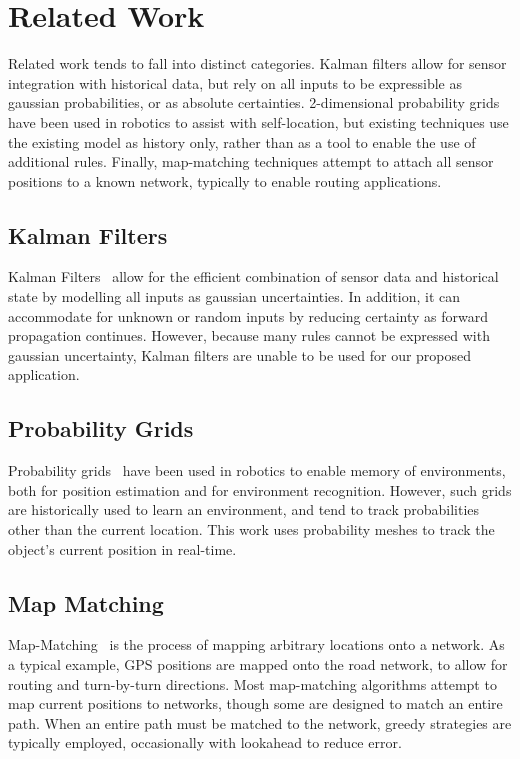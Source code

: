 \section{Related Work}

Related work tends to fall into distinct categories. Kalman filters allow for sensor integration with historical data, but rely on all inputs to be expressible as gaussian probabilities, or as absolute certainties.
2-dimensional probability grids have been used in robotics to assist with self-location, but existing techniques use the existing model as history only, rather than as a tool to enable the use of additional rules.
Finally, map-matching techniques attempt to attach all sensor positions to a known network, typically to enable routing applications.

\subsection{Kalman Filters}
  Kalman Filters~\cite{kalmanJBE60} allow for the efficient combination of sensor data and historical state by modelling all inputs as gaussian uncertainties. In addition, it can accommodate for unknown or random inputs by reducing certainty as forward propagation continues. However, because many rules cannot be expressed with gaussian uncertainty, Kalman filters are unable to be used for our proposed application.

\subsection{Probability Grids}
  Probability grids~\cite{burgardNCAI96} have been used in robotics to enable memory of environments, both for position estimation and for environment recognition. However, such grids are historically used to learn an environment, and tend to track probabilities other than the current location. This work uses probability meshes to track the object's current position in real-time.

\subsection{Map Matching}
  Map-Matching~\cite{brakatsoulasVLDB05} is the process of mapping arbitrary locations onto a network. As a typical example, GPS positions are mapped onto the road network, to allow for routing and turn-by-turn directions.
Most map-matching algorithms attempt to map current positions to networks, though some are designed to match an entire path. When an entire path must be matched to the network, greedy strategies are typically employed, occasionally with lookahead to reduce error.
